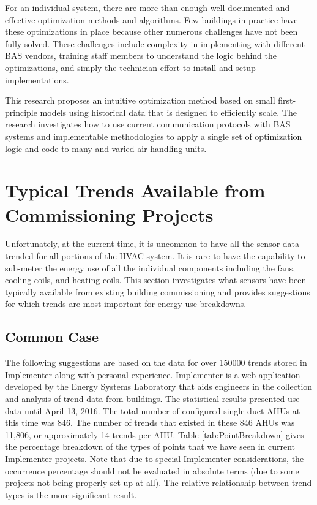 For an individual system, there are more than enough well-documented and
effective optimization methods and algorithms. Few buildings in practice
have these optimizations in place because other numerous challenges
have not been fully solved. These challenges include complexity in
implementing with different BAS vendors, training staff members to
understand the logic behind the optimizations, and simply the technician
effort to install and setup implementations.

This research proposes an intuitive optimization method based on
small first-principle models using historical data that is
designed to efficiently scale. The research investigates how to use
current communication protocols with BAS systems and implementable
methodologies to apply a single set of optimization logic and code to
many and varied air handling units. 

\section{Typical Trends Available from Commissioning Projects}

Unfortunately, at the current time, it is uncommon to have all the
sensor data trended for all portions of the HVAC system.  It is rare to
have the capability to sub-meter the energy use of all the individual
components including the fans, cooling coils, and heating coils. This
section investigates what sensors have been typically available from
existing building commissioning and provides suggestions for which
trends are most important for energy-use breakdowns. 

\subsection{Common Case}

The following suggestions are based on the data for over \num{150000}
trends stored in Implementer along with personal experience. Implementer
is a web application developed by the Energy Systems Laboratory that
aids engineers in the collection and analysis of trend data from
buildings.  The statistical results presented use data until April 13, 
2016. The total number of configured single duct AHUs at this time was
846. The number of trends that existed in these 846 AHUs was
11,806, or approximately 14 trends per AHU. Table
\ref{tab:PointBreakdown} gives the percentage breakdown of the types of
points that we have seen in current Implementer projects. Note that due
to special Implementer considerations, the occurrence percentage
should not be evaluated in absolute terms (due to some projects not being
properly set up at all). The relative relationship between trend types is
the more significant result.  


